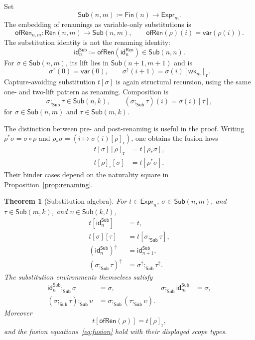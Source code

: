 \documentclass[10pt,reqno]{amsart}
\newtheorem{theorem}{Theorem}[section]
\newcommand{\Fin}{\mathsf{Fin}}
\newcommand{\Expr}{\mathsf{Expr}}
\newcommand{\Ren}{\mathsf{Ren}}
\newcommand{\Sub}{\mathsf{Sub}}
\newcommand{\Var}{\mathsf{var}}
\newcommand{\idren}{\mathsf{id}}
\newcommand{\wk}{\mathsf{wk}}
\newcommand{\lift}{\uparrow}
\begin{document}
Set
\[
       \Sub(n,m)\coloneqq\Fin(n)\to\Expr_m.
\]
The embedding of renamings as variable-only substitutions is
\[
 \mathsf{ofRen}_{n,m}:\Ren(n,m)\to\Sub(n,m),\qquad
 \mathsf{ofRen}(\rho)(i)=\Var(\rho(i)).
\tag{4.2}\label{eq:of-ren}
\]
The substitution identity is not the renaming identity:
\[
       \idren^{\Sub}_n\coloneqq
       \mathsf{ofRen}(\idren^{\Ren}_n)\in\Sub(n,n).
\]
For \(\sigma\in\Sub(n,m)\), its lift lies in
\(\Sub(n+1,m+1)\) and is
\[
\sigma^\lift(0)=\Var(0),\qquad
\sigma^\lift(i+1)=\sigma(i)[\wk_m]_{\mathrm r}.
\tag{4.3}\label{eq:sub-lift}
\]
Capture-avoiding substitution \(t[\sigma]\) is again structural recursion,
using the same one- and two-lift pattern as renaming.  Composition is
\[
 \sigma;_{\Sub}\tau\in\Sub(n,k),\qquad
 (\sigma;_{\Sub}\tau)(i)=\sigma(i)[\tau],
\tag{4.4}\label{eq:sub-composition}
\]
for \(\sigma\in\Sub(n,m)\) and \(\tau\in\Sub(m,k)\).

The distinction between pre- and post-renaming is useful in the proof.
Writing \(\rho^\ast\sigma=\sigma\circ\rho\) and
\(\rho_\ast\sigma=(i\mapsto\sigma(i)[\rho]_{\mathrm r})\), one obtains the
fusion laws
\[
\begin{aligned}
t[\sigma][\rho]_{\mathrm r}&=t[\rho_\ast\sigma],\\
t[\rho]_{\mathrm r}[\sigma]&=t[\rho^\ast\sigma].
\end{aligned}
\tag{4.5}\label{eq:fusion}
\]
Their binder cases depend on the naturality square in
Proposition~\ref{prop:renaming}.

\begin{theorem}[Substitution algebra]
\label{thm:substitution-algebra}
For \(t\in\Expr_n\), \(\sigma\in\Sub(n,m)\), and
\(\tau\in\Sub(m,k)\), and \(\upsilon\in\Sub(k,l)\),
\[
\begin{aligned}
t[\idren^{\Sub}_n]&=t,\\
t[\sigma][\tau]&=t[\sigma;_{\Sub}\tau],\\
(\idren^{\Sub}_n)^\lift&=\idren^{\Sub}_{n+1},\\
(\sigma;_{\Sub}\tau)^\lift&=\sigma^\lift;_{\Sub}\tau^\lift.
\end{aligned}
\tag{4.6}\label{eq:sub-algebra}
\]
The substitution environments themselves satisfy
\[
\begin{aligned}
\idren^{\Sub}_n;_{\Sub}\sigma&=\sigma,&
\sigma;_{\Sub}\idren^{\Sub}_m&=\sigma,\\
(\sigma;_{\Sub}\tau);_{\Sub}\upsilon
 &=\sigma;_{\Sub}(\tau;_{\Sub}\upsilon).
\end{aligned}
\tag{4.7}\label{eq:sub-environment-algebra}
\]
Moreover
\[
                 t[\mathsf{ofRen}(\rho)]=t[\rho]_{\mathrm r},
\tag{4.8}\label{eq:ofren-subst}
\]
and the fusion equations~\eqref{eq:fusion} hold with their displayed scope
types.
\end{theorem}
\end{document}
